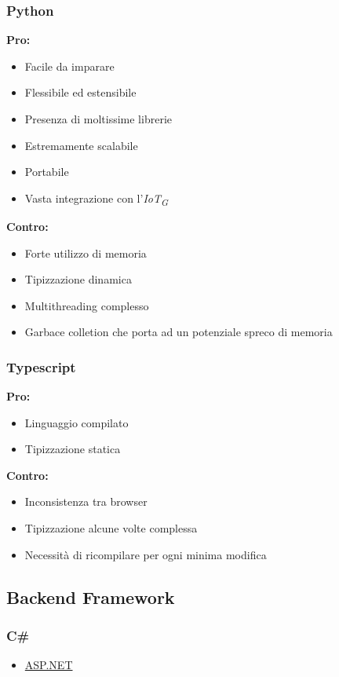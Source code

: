 \documentclass[a4paper, 12pt]{article}
\begin{document}
\subsubsection{Python}
\textbf{Pro:}
\begin{itemize}
    \item Facile da imparare
    \item Flessibile ed estensibile
    \item Presenza di moltissime librerie
    \item Estremamente scalabile
    \item Portabile
    \item Vasta integrazione con l'\textit{IoT\textsubscript{G}}
\end{itemize}
\vspace*{0.5cm}
\textbf{Contro:}
\begin{itemize}
    \item Forte utilizzo di memoria
    \item Tipizzazione dinamica
    \item Multithreading complesso
    \item Garbace colletion che porta ad un potenziale spreco di memoria
\end{itemize}
\subsubsection{Typescript}
\textbf{Pro:}
\begin{itemize}
    \item Linguaggio compilato
    \item Tipizzazione statica
\end{itemize}
\vspace*{0.5cm}
\textbf{Contro:}
\begin{itemize}
    \item Inconsistenza tra browser
    \item Tipizzazione alcune volte complessa
    \item Necessità di ricompilare per ogni minima modifica
\end{itemize}
\subsection{Backend Framework}
\subsubsection{C\#}
\begin{itemize}
    \item \href{https://dotnet.microsoft.com/en-us/apps/aspnet}{ASP.NET}
\end{itemize}
\end{document}
